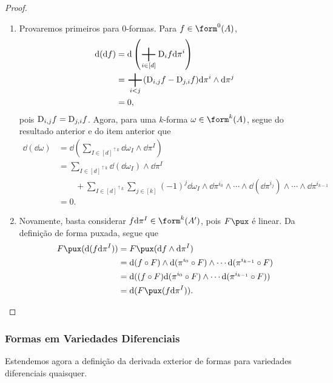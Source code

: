 \begin{proof}
\begin{enumerate}
	\item Provaremos primeiros para $0$-formas. Para $f \in \form^0 (A)$,
		\begin{align*}
		\dd(\dd f) &= \dd\left( \sum_{i \in [d]} \D_i f \dd\pi^i \right) \\
			&= \sum_{i<j} (\D_{i,j} f - \D_{j,i} f) \dd\pi^i \wedge \dd\pi^j \\
			&= 0,
		\end{align*}
pois $\mathrm{D}_{i,j} f = \mathrm{D}_{j,i} f$. Agora, para uma $k$-forma $\omega \in \form^k(A)$, segue do resultado anterior e do item anterior que
	\begin{align*}
	\dd(\dd \omega) &= \dd \left( \sum_{I \in [d]^{\uparrow k}} \dd \omega_I \wedge \dd\pi^I \right) \\
	&= \sum_{I \in [d]^{\uparrow k}} \dd(\dd \omega_I) \wedge \dd\pi^I \\
	&\qquad + \sum_{I \in [d]^{\uparrow k}}\sum_{j \in [k]}(-1)^j \dd \omega_I \wedge \dd\pi^{i_0} \wedge \cdots \wedge \dd(\dd\pi^{i_j}) \wedge \cdots \wedge \dd\pi^{i_{k-1}} \\
	&= 0.
	\end{align*}
	
	\item Novamente, basta considerar $f \dd\pi^I \in \form^k (A')$, pois $F\pux$ é linear. Da definição de forma puxada, segue que
		\begin{align*}
		F\pux (\dd(f \dd\pi^I)) &= F\pux (\dd f \wedge \dd\pi^I) \\
			&= \dd(f \circ F) \wedge \dd(\pi^{i_0} \circ F) \wedge \cdots \dd(\pi^{i_{k-1}} \circ F) \\
			&= \dd((f \circ F)\dd(\pi^{i_0} \circ F) \wedge \cdots \dd(\pi^{i_{k-1}} \circ F)) \\
			&= \dd(F\pux(f \dd\pi^I)).
		\end{align*}
	\end{enumerate}
\end{proof}


\subsubsection{Formas em Variedades Diferenciais}

Estendemos agora a definição da derivada exterior de formas para variedades diferenciais quaisquer.

